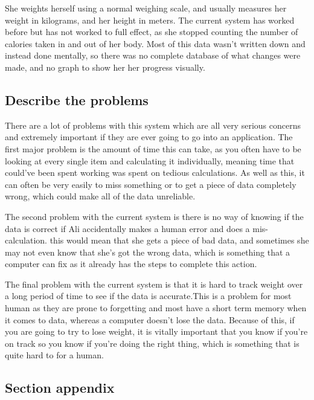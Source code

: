 She weights herself using a normal weighing scale, and usually measures her weight in kilograms, and her height in meters. The current system has worked before but has not worked to full effect, as she stopped counting the number of calories taken in and out of her body. Most of this data wasn't written down and instead done mentally, so there was no complete database of what changes were made, and no graph to show her her progress visually.

\subsection{Describe the problems}
There are a lot of problems with this system which are all very serious concerns and extremely important if they are ever going to go into an application. The first major problem is the amount of time this can take, as you often have to be looking at every single item and calculating it individually, meaning time that could've been spent working was spent on tedious calculations. As well as this, it can often be very easily to miss something or to get a piece of data completely wrong, which could make all of the data unreliable.

The second problem with the current system is there is no way of knowing if the data is correct if Ali accidentally makes a human error and does a mis-calculation. this would mean that she gets a piece of bad data, and sometimes she may not even know that she's got the wrong data, which is something that a computer can fix as it already has the steps to complete this action.

The final problem with the current system is that it is hard to track weight over a long period of time to see if the data is accurate.This is a problem for most human as they are prone to forgetting and most have a short term memory when it comes to data, whereas a computer doesn't lose the data. Because of this, if you are going to try to lose weight, it is vitally important that you know if you're on track so you know if you're doing the right thing, which is something that is quite hard to for a human.

\subsection{Section appendix}


